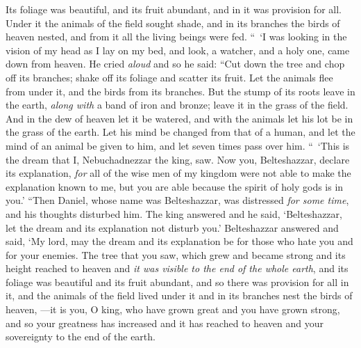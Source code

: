 \begin{biblechapter}
\verse Its foliage was beautiful, 
and its fruit abundant, 
and in it was provision for all. 
Under it the animals of the field sought shade, 
and in its branches the birds of heaven nested, 
and from it all the living beings were fed.
\verse “ ‘I was looking in the vision of my head as I lay on my bed, and look, a watcher, and a holy one, came down from heaven.
\verse He cried \textit{aloud} and so he said:
\verse “Cut down the tree and chop off its branches; 
shake off its foliage and scatter its fruit. 
Let the animals flee from under it, 
and the birds from its branches.
\verse But the stump of its roots 
leave in the earth, 
\textit{along with} a band of iron and bronze; 
leave it in the grass of the field. 
And in the dew of heaven 
let it be watered, 
and with the animals 
let his lot be in the grass of the earth.
\verse Let his mind be changed from that of a human, 
and let the mind of an animal be given to him, 
and let seven times pass over him.
\verse “ ‘This is the dream that I, Nebuchadnezzar the king, saw. Now you, Belteshazzar, declare its explanation, \textit{for} all of the wise men of my kingdom were not able to make the explanation known to me, but you are able because the spirit of holy gods is in you.’
 “Then Daniel, whose name was Belteshazzar, was distressed \textit{for some time}, and his thoughts disturbed him. The king answered and he said, ‘Belteshazzar, let the dream and its explanation not disturb you.’ Belteshazzar answered and said, ‘My lord, may the dream and its explanation be for those who hate you and for your enemies.
\verse The tree that you saw, which grew and became strong and its height reached to heaven and \textit{it was visible to the end of the whole earth},
\verse and its foliage was beautiful and its fruit abundant, and so there was provision for all in it, and the animals of the field lived under it and in its branches nest the birds of heaven,
\verse —it is you, O king, who have grown great and you have grown strong, and so your greatness has increased and it has reached to heaven and your sovereignty to the end of the earth.

\end{biblechapter}
